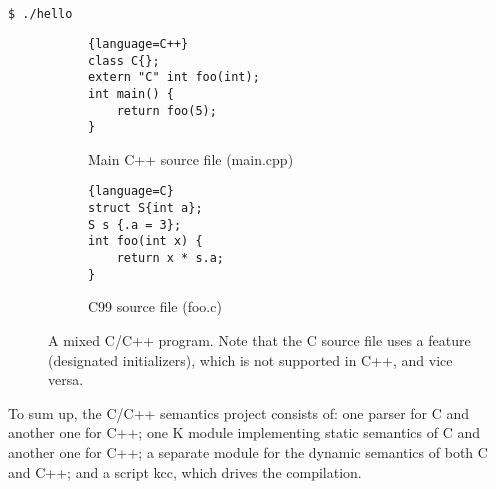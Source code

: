 \documentclass{fithesis3}
\begin{document}
\begin{lstlisting}[language=bash]
$ ./hello
\end{lstlisting}






\begin{figure}
\centering
\begin{subfigure}{.5\textwidth}
  \centering

\begin{lstlisting}{language=C++}
class C{};
extern "C" int foo(int);
int main() {
	return foo(5);
}
\end{lstlisting}

  \caption{Main C++ source file (main.cpp)}
\end{subfigure}%
\begin{subfigure}{.5\textwidth}
  \centering
\begin{lstlisting}{language=C}
struct S{int a};
S s {.a = 3};
int foo(int x) {
	return x * s.a;
}
\end{lstlisting}
  \caption{C99 source file (foo.c)}
\end{subfigure}
\caption{A mixed C/C++ program. Note that the C source file uses a feature (designated initializers), which is not supported in C++, and vice versa.}
\label{fig:cpp-program-example}
\end{figure}


To sum up, the C/C++ semantics project consists of: one parser for C and another one for C++; one K module implementing static semantics of C and another one for C++; a separate module for the dynamic semantics of both C and C++; and a script kcc, which drives the compilation.

\end{document}
